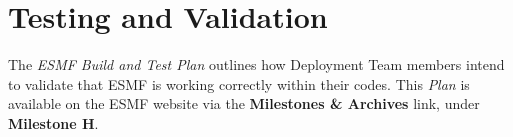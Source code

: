 
\section{Testing and Validation}
\label{sec:app_testing}

The {\it ESMF Build and Test Plan} outlines how Deployment 
Team members intend to validate that
ESMF is working correctly within their codes.  This {\it Plan}
is available on the ESMF website via the {\bf Milestones \&
Archives} link, under {\bf Milestone H}.

















